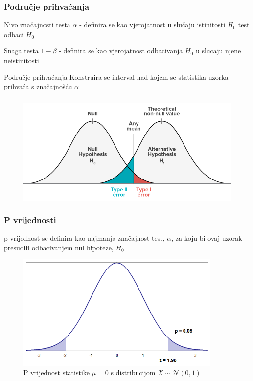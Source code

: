 \documentclass{beamer}
\begin{document}
\begin{frame}
	\frametitle{Područje prihvaćanja}

	\begin{block}{Nivo značajnosti testa}
		$\alpha$ - definira se kao vjerojatnost u slučaju istinitosti $H_0$ test odbaci $H_0$
	\end{block} \pause

	\begin{block}{Snaga testa}
		$1-\beta$ - definira se kao vjerojatnost odbacivanja $H_0$ u slucaju njene neistinitosti
	\end{block} \pause

	\begin{block}{Područje prihvaćanja}
		Konstruira se interval nad kojem se statistika uzorka prihvaća s značajnošću $\alpha$
	\end{block}
\end{frame}

\begin{frame}
	\frametitle{}
	\begin{figure}
		\centering
		\includegraphics[width=\textwidth,height=0.8\textheight,keepaspectratio]{type12.png}
	\end{figure}
\end{frame}


\begin{frame}
	\frametitle{P vrijednosti}
	p vrijednost se definira kao najmanja značajnost test, $\alpha$, za koju bi ovaj uzorak presudili odbacivanjem nul hipoteze, $H_0$

	\begin{figure}[ph]
	    \centering
	    \includegraphics[width=0.9\textwidth,height=0.7\textheight,keepaspectratio]{pvalue2.png}
	    \caption{P vrijednost statistike $\mu = 0$ s distribucijom $X \sim \mathcal{N}(0,1)$}
		\label{fig:pvalue2}
	\end{figure}
\end{frame}
\end{document}
